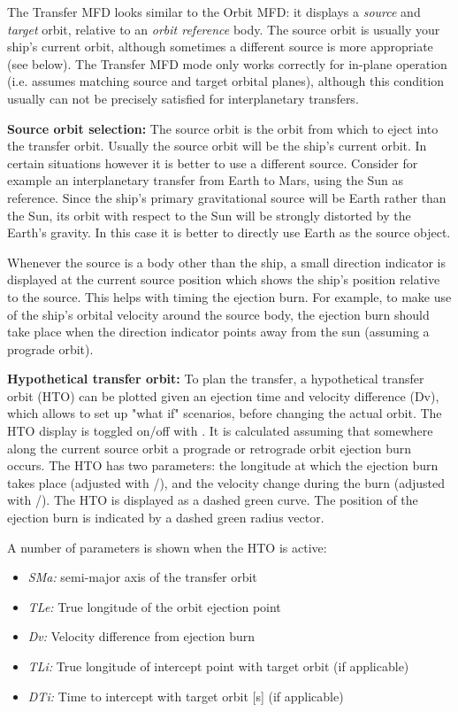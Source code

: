 \documentclass[Orbiter User Manual.tex]{subfiles}
\begin{document}
The Transfer MFD looks similar to the Orbit MFD: it displays a \emph{source} and
\emph{target} orbit, relative to an \emph{orbit reference} body. The source
orbit is usually your ship's current orbit, although sometimes a different
source is more appropriate (see below). The Transfer MFD mode only works
correctly for in-plane operation (i.e. assumes matching source and target
orbital planes), although this condition usually can not be precisely satisfied
for interplanetary transfers.

\textbf{Source orbit selection:}
The source orbit is the orbit from which to eject into the transfer orbit.
Usually the source orbit will be the ship's current orbit. In certain situations
however it is better to use a different source. Consider for example an
interplanetary transfer from Earth to Mars, using the Sun as reference. Since
the ship's primary gravitational source will be Earth rather than the Sun, its
orbit with respect to the Sun will be strongly distorted by the Earth's gravity.
In this case it is better to directly use Earth as the source object.

Whenever the source is a body other than the ship, a small direction indicator
is displayed at the current source position which shows the ship's position
relative to the source. This helps with timing the ejection burn. For example,
to make use of the ship's orbital velocity around the source body, the ejection
burn should take place when the direction indicator points away from the sun
(assuming a prograde orbit).

\textbf{Hypothetical transfer orbit:}
To plan the transfer, a hypothetical transfer orbit (HTO) can be plotted given
an ejection time and velocity difference (Dv), which allows to set up "what if"
scenarios, before changing the actual orbit. The HTO display is toggled on/off
with . It is calculated assuming that somewhere along the current
source orbit a prograde or retrograde orbit ejection burn occurs. The HTO has
two parameters: the longitude at which the ejection burn takes place (adjusted
with \mfdkey{,}/), and the velocity change during the burn (adjusted
with \mfdkey{-}/\mfdkey{=}). The HTO is displayed as a dashed green curve. The
position of the ejection burn is indicated by a dashed green radius vector.

A number of parameters is shown when the HTO is active:
\begin{itemize}
	\item \emph{SMa:} semi-major axis of the transfer orbit
	\item \emph{TLe:} True longitude of the orbit ejection point
	\item \emph{Dv:} Velocity difference from ejection burn
	\item \emph{TLi:} True longitude of intercept point with target orbit (if
		applicable)
	\item \emph{DTi:} Time to intercept with target orbit [s] (if applicable)
\end{itemize}
\end{document}
